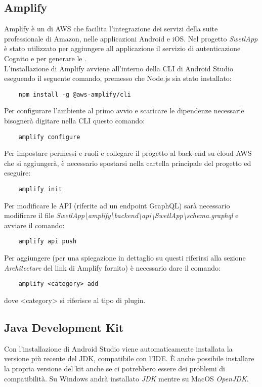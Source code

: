 \subsection{Amplify}
Amplify è un  di AWS che facilita l'integrazione dei servizi della suite professionale di Amazon, nelle applicazioni Android e iOS. Nel progetto \emph{SwetlApp} è stato utilizzato per aggiungere all applicazione il servizio di autenticazione Cognito e per generare le .\\[0.25cm]
L'installazione di Amplify avviene all'interno della CLI di Android Studio eseguendo il seguente comando, premesso che Node.js sia stato installato:
\begin{verbatim}
    npm install -g @aws-amplify/cli
\end{verbatim}
Per configurare l'ambiente al primo avvio e scaricare le dipendenze necessarie bisognerà digitare nella CLI questo comando:
\begin{verbatim}
    amplify configure
\end{verbatim}
Per impostare permessi e ruoli e collegare il progetto al back-end su cloud AWS che si aggiungerà, è necessario spostarsi nella cartella principale del progetto ed eseguire:
\begin{verbatim}
    amplify init
\end{verbatim}
Per modificare le API (riferite ad un endpoint GraphQL) sarà necessario modificare il file \emph{SwetlApp\textbackslash{}amplify\textbackslash{}backend\textbackslash{}api{}\textbackslash{}SwetlApp{}\textbackslash{}schema.graphql} e avviare il comando:
\begin{verbatim}
    amplify api push
\end{verbatim}
Per aggiungere  (per una spiegazione in dettaglio su questi riferirsi alla sezione \textit{Architecture} del link di Amplify fornito) è necessario dare il comando:
\begin{verbatim}
    amplify <category> add
\end{verbatim}
dove <category> si riferisce al tipo di plugin.

\subsection{Java Development Kit}
Con l'installazione di Android Studio viene automaticamente installata la versione più recente del JDK, compatibile con l'IDE. È anche possibile installare la propria versione del kit anche se ci potrebbero essere dei problemi di compatibilità. Su Windows andrà installato \emph{JDK} mentre su MacOS \emph{OpenJDK}.